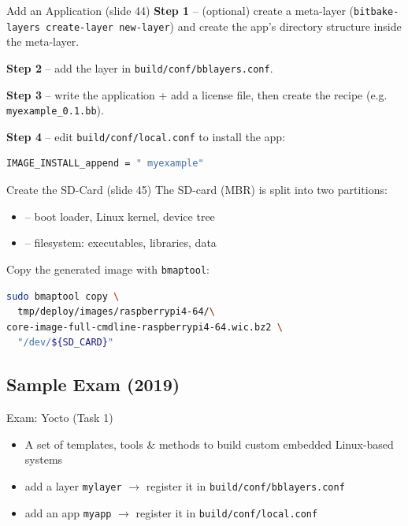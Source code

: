 \begin{KR}{Add an Application (slide 44)}
    \textbf{Step 1} -- (optional) create a meta-layer
    (\texttt{bitbake-layers create-layer new-layer}) and create the app's
    directory structure inside the meta-layer.

    \textbf{Step 2} -- add the layer in \texttt{build/conf/bblayers.conf}.

    \textbf{Step 3} -- write the application + add a license file, then create the
    recipe (e.g. \texttt{myexample\_0.1.bb}).

    \textbf{Step 4} -- edit \texttt{build/conf/local.conf} to install the app:
\begin{lstlisting}[language=bash, style=basesmol, aboveskip=2pt, belowskip=2pt]
IMAGE_INSTALL_append = " myexample"
\end{lstlisting}
\end{KR}

\begin{KR}{Create the SD-Card (slide 45)}
    The SD-card (MBR) is split into two partitions:
    \begin{itemize}
        \item {} -- boot loader, Linux kernel, device tree
        \item {} -- filesystem: executables, libraries, data
    \end{itemize}
    Copy the generated image with \texttt{bmaptool}:
\begin{lstlisting}[language=bash, style=basesmol, aboveskip=2pt, belowskip=2pt]
sudo bmaptool copy \
  tmp/deploy/images/raspberrypi4-64/\
core-image-full-cmdline-raspberrypi4-64.wic.bz2 \
  "/dev/${SD_CARD}"
\end{lstlisting}
\end{KR}

\subsection{Sample Exam (2019)}

\begin{example2}{Exam: Yocto (Task 1)}
    \begin{itemize}
        \item {} A set of templates, tools \& methods to build
              custom embedded Linux-based systems
        \item add a layer \texttt{mylayer} $\to$ register it in
              \texttt{build/conf/bblayers.conf}
        \item add an app \texttt{myapp} $\to$ register it in
              \texttt{build/conf/local.conf}
    \end{itemize}
\end{example2}

